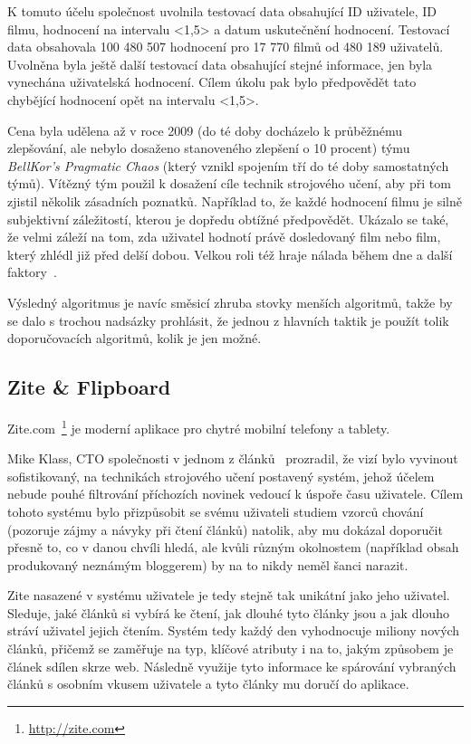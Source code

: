 \documentclass[thesis=M,czech]{FITthesis}[2014/05/07]
\begin{document}
K tomuto účelu společnost uvolnila testovací data obsahující ID uživatele, ID filmu, hodnocení na intervalu <1,5> a datum uskutečnění hodnocení. Testovací data obsahovala 100 480 507 hodnocení pro 17 770 filmů od 480 189 uživatelů. Uvolněna byla ještě další testovací data obsahující stejné informace, jen byla vynechána uživatelská hodnocení. Cílem úkolu pak bylo předpovědět tato chybějící hodnocení opět na intervalu <1,5>.

Cena byla udělena až v roce 2009 (do té doby docházelo k průběžnému zlepšování, ale nebylo dosaženo stanoveného zlepšení o 10 procent) týmu \emph{BellKor's Pragmatic Chaos} (který vznikl spojením tří do té doby samostatných týmů). Vítězný tým použil k dosažení cíle technik strojového učení, aby při tom zjistil několik zásadních poznatků. Například to, že každé hodnocení filmu je silně subjektivní záležitostí, kterou je dopředu obtížné předpovědět. Ukázalo se také, že velmi záleží na tom, zda uživatel hodnotí právě dosledovaný film nebo film, který zhlédl již před delší dobou. Velkou roli též hraje nálada během dne a další faktory~\cite{bellkor}.

Výsledný algoritmus je navíc směsicí zhruba stovky menších algoritmů, takže by se dalo s trochou nadsázky prohlásit, že jednou z hlavních taktik je použít tolik doporučovacích algoritmů, kolik je jen možné. 

\subsection{Zite \& Flipboard}

Zite.com~\footnote{\url{http://zite.com}} je moderní aplikace pro chytré mobilní telefony a tablety.

Mike Klass, CTO společnosti v jednom z článků~\cite{ziteflip} prozradil, že vizí bylo vyvinout sofistikovaný, na technikách strojového učení postavený systém, jehož účelem nebude pouhé filtrování příchozích novinek vedoucí k úspoře času uživatele. Cílem tohoto systému bylo přizpůsobit se svému uživateli studiem vzorců chování (pozoruje zájmy a návyky při čtení článků) natolik, aby mu dokázal doporučit přesně to, co v danou chvíli hledá, ale kvůli různým okolnostem (například obsah produkovaný neznámým bloggerem) by na to nikdy neměl šanci narazit.

Zite nasazené v systému uživatele je tedy stejně tak unikátní jako jeho uživatel. Sleduje, jaké článků si vybírá ke čtení, jak dlouhé tyto články jsou a jak dlouho stráví uživatel jejich čtením. Systém tedy každý den vyhodnocuje miliony nových článků, přičemž se zaměřuje na typ, klíčové atributy i na to, jakým způsobem je článek sdílen skrze web. Následně využije tyto informace ke spárování vybraných článků s osobním vkusem uživatele a tyto články mu doručí do aplikace. 
\end{document}
